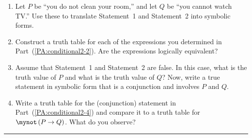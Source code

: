 \setcounter{oldenumi}{\theenumi}
\begin{enumerate} \setcounter{enumi}{\theoldenumi}

  \item \label{PA:conditional2-2}%
   Let  $P$  be  ``you do not clean your room,'' and let  $Q$  be ``you cannot watch TV.''  Use these to translate Statement~1 and Statement~2 into symbolic forms. 

  \item Construct a truth table for each of the expressions you determined in 
Part~(\ref{PA:conditional2-2}).  Are the expressions logically equivalent? \label{PA:logequiv6}

  \item \label{PA:conditional2-4}%
     Assume that Statement~1 and Statement~2 are false.  In this case, what is the truth value of $P$ and what is the truth value of $Q$?  Now, write a true statement in symbolic form that is a conjunction and involves $P$ and $Q$.


  \item Write a truth table for the (conjunction) statement in Part~(\ref{PA:conditional2-4}) and compare it to a truth table for  $\mynot  \left( {P \to Q} \right)$.  What do you observe?
\end{enumerate}
\hrule
\vskip6pt

\endinput

What would it mean to say that Statement \#1 is false?  What would it mean to say that Statement \#2 is false?  Write your answers to these questions in symbolic form using  $P$  and  $Q$. 
